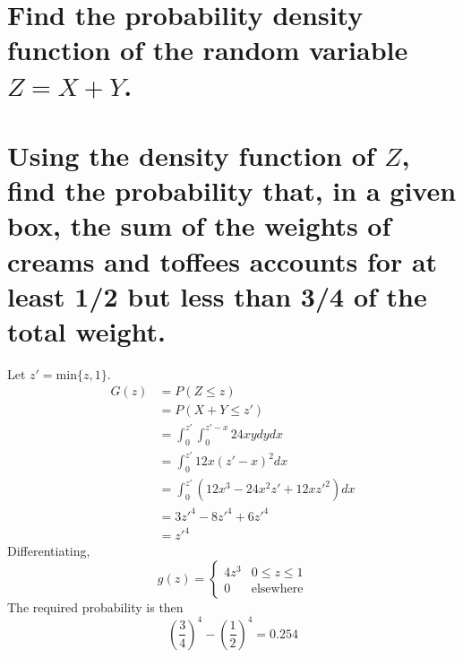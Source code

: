 \documentclass[answers]{exam}
\begin{document}
\begin{questions}

\begin{parts}
	\part{Find the probability density function of the random variable $Z = X + Y$.}
	\part{Using the density function of $Z$, find the probability that, in a given box, the sum of the weights of creams and toffees accounts for at least 1/2 but less than 3/4 of the total weight.}
\end{parts}

\begin{solution}
	Let $z' = \text{min}\{z,1\}$.
	\begin{align*}
		G(z) &= P(Z \leq z) \\
		     &= P(X + Y \leq z') \\
		     &= \int_0^{z'} \int_0^{z'-x} 24xy dydx \\
		     &= \int_0^{z'} 12x(z'-x)^2 dx \\
		     &= \int_0^{z'} (12x^3 - 24x^2 z' + 12xz'^2) dx \\
		     &= 3z'^4 - 8z'^4 + 6z'^4 \\
		     &= z'^4
	\end{align*}
	Differentiating,
	$$g(z) = \begin{cases} 4z^3 & 0 \leq z \leq 1 \\ 0 & \text{elsewhere} \end{cases}$$
	The required probability is then
	$$\left(\frac{3}{4}\right)^4 - \left(\frac{1}{2}\right)^4 = 0.254$$
\end{solution}

 \label{this}


\end{questions}
\end{document}
